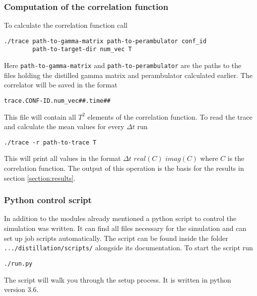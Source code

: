     \subsubsection{Computation of the correlation function}
        To calculate the correlation function call
        \begin{verbatim}
./trace path-to-gamma-matrix path-to-perambulator conf_id 
        path-to-target-dir num_vec T\end{verbatim}
        Here \verb+path-to-gamma-matrix+ and \verb+path-to-perambulator+ are the paths to the files holding the distilled gamma matrix and perambulator calculated earlier. The correlator will be saved in the format
        \begin{verbatim}
trace.CONF-ID.num_vec##.time##\end{verbatim}
        This file will contain all $T^2$ elements of the correlation function. To read the trace and calculate the mean values for every $\Delta t$ run
        \begin{verbatim}
./trace -r path-to-trace T\end{verbatim}
        This will print all values in the format $\Delta t$ $real(C)$ $imag(C)$ where $C$ is the correlation function. The output of this operation is the basis for the results in section \ref{section:results}.
        
    \subsubsection{Python control script}
        In addition to the modules already mentioned a python script to control the simulation was written. It can find all files necessary for the simulation and can set up job scripts automatically. The script can be found inside the folder \verb+.../distillation/scripts/+ alongside its documentation. To start the script run
        \begin{verbatim}
./run.py\end{verbatim}
        The script will walk you through the setup process. It is written in python version 3.6.
    